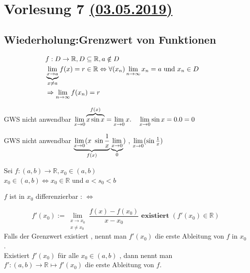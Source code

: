 \section{Vorlesung 7 \href{https://tu-dresden.de/mn/math/algebra/das-institut/beschaeftigte/antje-noack/ressourcen/dateien/v120-1/MathMethInf07.pdf?lang=en}{(03.05.2019)} }

\subsection{ Wiederholung:Grenzwert von Funktionen }
\begin{align*}
&	f:D \rightarrow \mathbb{R} , D \subseteq \mathbb{R} , a \notin D &\\
&\underbrace{\lim_{x\to a}}_{x \neq a} f(x)= r \in \mathbb{R}  \Leftrightarrow \forall (x_n) \lim\limits_{n \rightarrow \infty} x_n= a \text{  und  } x_n \in D \\
&\Rightarrow \lim\limits_{n \rightarrow \infty} f(x_n)=r
\end{align*}
\begin{example}

GWS nicht anwendbar $\lim\limits_{x \to 0} \overbrace{ x \sin x }^{f(x)} = \lim\limits_{x \to 0} x  .\quad \lim\limits_{x \to 0} \sin x=0. 0=0$
\end{example}
\begin{remark}
GWS nicht anwendbar $\underbrace{\limXo(x \ \sin \frac{1}{x}}_{f(x)} \underbrace{\limXo}_{0})$ , $\lim\limits_{x \to 0}( \sin \frac{1}{x} )$
\end{remark}
\begin{definition}
Sei $f: (a,b) \to \mathbb{R} , x_0 \in (a,b) $\\
	 $x_0 \in (a,b) \Leftrightarrow  x_0 \in \mathbb{R} $  und  $ a<s_0 < b  $
	 
	 
	$f$ ist in $x_0$  differenzierbar : $\Leftrightarrow$
	
$$	 f'(x_0) := \lim_{\substack{x \to x_0 \\ x \neq x_0}}\frac{f(x) - f(x_0)}{x-x_0} \textbf{ existiert }   (f'(x_0) \in \mathbb{R}) $$
Falls der Grenzwert existiert , nennt man $f'(x_0)$ die erste Ableitung von $f$ in $x_0$.\\
Existiert $f'(x_0)$ für alle $x_0 \in (a,b)$ , dann nennt man $ f':(a,b) \rightarrow \mathbb{R} \longmapsto f'(x_0)$ die erste Ableitung von $f$.

	

\end{definition}
